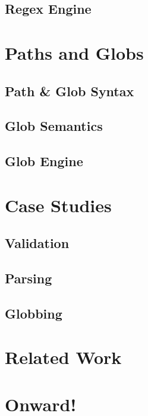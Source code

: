 \documentclass[sigplan,10pt,review,anonymous]{acmart}
\begin{document}
\subsection{Regex Engine}

\section{Paths and Globs}

\subsection{Path \& Glob Syntax}

\subsection{Glob Semantics}

\subsection{Glob Engine}

\section{Case Studies}

\subsection{Validation}

\subsection{Parsing}

\subsection{Globbing}

\section{Related Work}

\section{Onward!}




\end{document}
